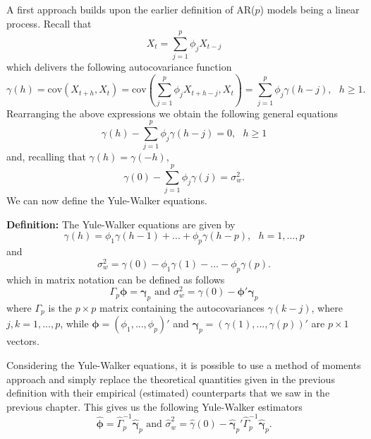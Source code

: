 \documentclass[]{book}
\theoremstyle{definition}
\theoremstyle{definition}
\theoremstyle{definition}
\theoremstyle{remark}
\begin{document}
A first approach builds upon the earlier definition of AR(\(p\)) models
being a linear process. Recall that \begin{equation}
    X_t = \sum_{j = 1}^{p} \phi_j X_{t-j}
\end{equation} which delivers the following autocovariance function
\begin{equation}
    \gamma(h) = \text{cov}(X_{t+h}, X_t) = \text{cov}\left(\sum_{j = 1}^{p} \phi_j X_{t+h-j}, X_t\right) = \sum_{j = 1}^{p} \phi_j \gamma(h-j), \mbox{ } h \geq 1.
\end{equation} Rearranging the above expressions we obtain the following
general equations \begin{equation}
    \gamma(h) - \sum_{j = 1}^{p} \phi_j \gamma(h-j) = 0, \mbox{ } h \geq 1
\end{equation} and, recalling that \(\gamma(h) = \gamma(-h)\),
\begin{equation}
    \gamma(0) - \sum_{j = 1}^{p} \phi_j \gamma(j) = \sigma_w^2.
\end{equation} We can now define the Yule-Walker equations.

\textbf{Definition:} The Yule-Walker equations are given by
\begin{equation}
    \gamma(h) = \phi_1 \gamma(h-1) + ... + \phi_p \gamma(h-p), \mbox{ } h = 1,...,p
\end{equation} and \begin{equation}
    \sigma_w^2 = \gamma(0) - \phi_1 \gamma(1) - ... - \phi_p \gamma(p).
\end{equation} which in matrix notation can be defined as follows
\begin{equation}
    \Gamma_p \mathbf{\phi} = \mathbf{\gamma}_p \,\, \text{and} \,\, \sigma_w^2 = \gamma(0) - \mathbf{\phi}'\mathbf{\gamma}_p
\end{equation} where \(\Gamma_p\) is the \(p\times p\) matrix containing
the autocovariances \(\gamma(k-j)\), where \(j,k = 1, ...,p\), while
\(\mathbf{\phi} = (\phi_1,...,\phi_p)'\) and
\(\mathbf{\gamma}_p = (\gamma(1),...,\gamma(p))'\) are \(p\times 1\)
vectors.

Considering the Yule-Walker equations, it is possible to use a method of
moments approach and simply replace the theoretical quantities given in
the previous definition with their empirical (estimated) counterparts
that we saw in the previous chapter. This gives us the following
Yule-Walker estimators \begin{equation}
    \hat{\mathbf{\phi}} = \hat{\Gamma}_p^{-1}\hat{\mathbf{\gamma}}_p \,\, \text{and} \,\, \hat{\sigma}_w^2 = \hat{\gamma}(0) - \hat{\mathbf{\gamma}}_p'\hat{\Gamma}_p^{-1}\hat{\mathbf{\gamma}}_p .
\end{equation}
\end{document}
